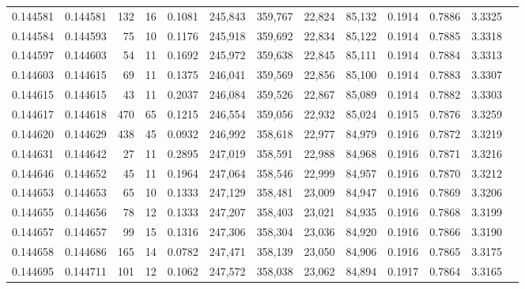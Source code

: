 \begin{tabular}{rrrrrrrrrrrrr}
0.144581 & 0.144581 &   132 &  16 &                                     0.1081 & 245,843 & 359,767 &  22,824 &  85,132 & 0.1914 & 0.7886 & 3.3325 \\
0.144584 & 0.144593 &    75 &  10 &                                     0.1176 & 245,918 & 359,692 &  22,834 &  85,122 & 0.1914 & 0.7885 & 3.3318 \\
0.144597 & 0.144603 &    54 &  11 &                                     0.1692 & 245,972 & 359,638 &  22,845 &  85,111 & 0.1914 & 0.7884 & 3.3313 \\
0.144603 & 0.144615 &    69 &  11 &                                     0.1375 & 246,041 & 359,569 &  22,856 &  85,100 & 0.1914 & 0.7883 & 3.3307 \\
0.144615 & 0.144615 &    43 &  11 &                                     0.2037 & 246,084 & 359,526 &  22,867 &  85,089 & 0.1914 & 0.7882 & 3.3303 \\
0.144617 & 0.144618 &   470 &  65 &                                     0.1215 & 246,554 & 359,056 &  22,932 &  85,024 & 0.1915 & 0.7876 & 3.3259 \\
0.144620 & 0.144629 &   438 &  45 &                                     0.0932 & 246,992 & 358,618 &  22,977 &  84,979 & 0.1916 & 0.7872 & 3.3219 \\
0.144631 & 0.144642 &    27 &  11 &                                     0.2895 & 247,019 & 358,591 &  22,988 &  84,968 & 0.1916 & 0.7871 & 3.3216 \\
0.144646 & 0.144652 &    45 &  11 &                                     0.1964 & 247,064 & 358,546 &  22,999 &  84,957 & 0.1916 & 0.7870 & 3.3212 \\
0.144653 & 0.144653 &    65 &  10 &                                     0.1333 & 247,129 & 358,481 &  23,009 &  84,947 & 0.1916 & 0.7869 & 3.3206 \\
0.144655 & 0.144656 &    78 &  12 &                                     0.1333 & 247,207 & 358,403 &  23,021 &  84,935 & 0.1916 & 0.7868 & 3.3199 \\
0.144657 & 0.144657 &    99 &  15 &                                     0.1316 & 247,306 & 358,304 &  23,036 &  84,920 & 0.1916 & 0.7866 & 3.3190 \\
0.144658 & 0.144686 &   165 &  14 &                                     0.0782 & 247,471 & 358,139 &  23,050 &  84,906 & 0.1916 & 0.7865 & 3.3175 \\
0.144695 & 0.144711 &   101 &  12 &                                     0.1062 & 247,572 & 358,038 &  23,062 &  84,894 & 0.1917 & 0.7864 & 3.3165 \\

\end{tabular}
